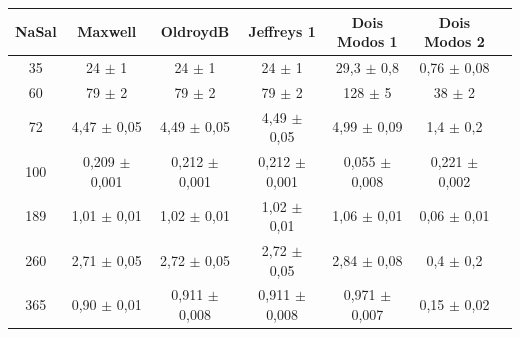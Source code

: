 		\begin{table}[h]
		{%
			\begin{tabular}{c | c c c c c c}
				\toprule
				NaSal & Maxwell               & OldroydB               & Jeffreys 1               & Dois Modos 1               & Dois Modos 2               &  \\ \midrule
				 35   & 24      \(\pm\) 1     & 24       \(\pm\) 1     & 24        \(\pm\) 1     & 29,3        \(\pm\) 0,8   & 0,76        \(\pm\) 0,08  &  \\
				 60   & 79      \(\pm\) 2     & 79       \(\pm\) 2     & 79        \(\pm\) 2     & 128         \(\pm\) 5     & 38          \(\pm\) 2     &  \\
				 72   & 4,47    \(\pm\) 0,05  & 4,49     \(\pm\) 0,05  & 4,49      \(\pm\) 0,05  & 4,99        \(\pm\) 0,09  & 1,4         \(\pm\) 0,2   &  \\
				 100  & 0,209   \(\pm\) 0,001 & 0,212    \(\pm\) 0,001 & 0,212     \(\pm\) 0,001 & 0,055       \(\pm\) 0,008 & 0,221       \(\pm\) 0,002 &  \\
				 189  & 1,01    \(\pm\) 0,01  & 1,02     \(\pm\) 0,01  & 1,02      \(\pm\) 0,01  & 1,06        \(\pm\) 0,01  & 0,06        \(\pm\) 0,01  &  \\
				 260  & 2,71    \(\pm\) 0,05  & 2,72     \(\pm\) 0,05  & 2,72      \(\pm\) 0,05  & 2,84        \(\pm\) 0,08  & 0,4         \(\pm\) 0,2   &  \\
				 365  & 0,90    \(\pm\) 0,01  & 0,911    \(\pm\) 0,008 & 0,911     \(\pm\) 0,008 & 0,971       \(\pm\) 0,007 & 0,15        \(\pm\) 0,02  &  \\ \bottomrule
			\end{tabular}
		}{}
	\end{table}  

